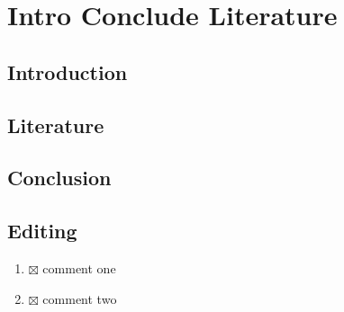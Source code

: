 \section{Intro Conclude Literature}


\begin{abstract}
\singlespacing \abstractB
\end{abstract}

\subsection{Introduction}


\subsection{Literature}


\subsection{Conclusion}


\subsection{Editing}
\begin{enumerate}
  \item $\boxtimes$ comment one
  \item $\boxtimes$ comment two
\end{enumerate}
